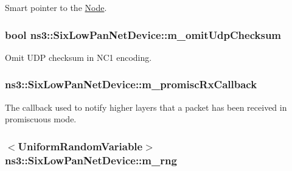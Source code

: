 Smart pointer to the \hyperlink{classns3_1_1Node}{Node}. 

\subsubsection[{\texorpdfstring{m\+\_\+omit\+Udp\+Checksum}{m_omitUdpChecksum}}]{\setlength{\rightskip}{0pt plus 5cm}bool ns3\+::\+Six\+Low\+Pan\+Net\+Device\+::m\+\_\+omit\+Udp\+Checksum\hspace{0.3cm}{\ttfamily [private]}}\hypertarget{classns3_1_1SixLowPanNetDevice_aa3503adbbb86b19e4ec2d17f3c8436f7}{}\label{classns3_1_1SixLowPanNetDevice_aa3503adbbb86b19e4ec2d17f3c8436f7}


Omit U\+DP checksum in N\+C1 encoding. 

\subsubsection[{\texorpdfstring{m\+\_\+promisc\+Rx\+Callback}{m_promiscRxCallback}}]{ ns3\+::\+Six\+Low\+Pan\+Net\+Device\+::m\+\_\+promisc\+Rx\+Callback\hspace{0.3cm}{\ttfamily [private]}}\hypertarget{classns3_1_1SixLowPanNetDevice_add2ead5d1d3c4a9b22bc8d01e0c04d83}{}\label{classns3_1_1SixLowPanNetDevice_add2ead5d1d3c4a9b22bc8d01e0c04d83}
The callback used to notify higher layers that a packet has been received in promiscuous mode. 
\subsubsection[{\texorpdfstring{m\+\_\+rng}{m_rng}}]{$<${\bf Uniform\+Random\+Variable}$>$ ns3\+::\+Six\+Low\+Pan\+Net\+Device\+::m\+\_\+rng\hspace{0.3cm}{\ttfamily [private]}}\hypertarget{classns3_1_1SixLowPanNetDevice_a2790a5f0228097a1e52b728dcdbf70d2}{}\label{classns3_1_1SixLowPanNetDevice_a2790a5f0228097a1e52b728dcdbf70d2}


